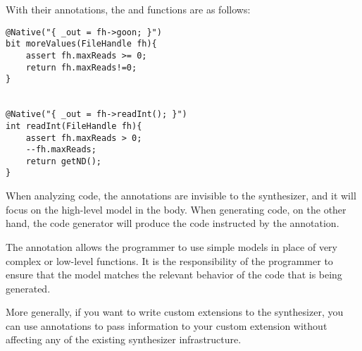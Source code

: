 \begin{Example}
With their annotations, the  and  functions are as follows:
\begin{lstlisting}
@Native("{ _out = fh->goon; }")
bit moreValues(FileHandle fh){
    assert fh.maxReads >= 0; 
    return fh.maxReads!=0;
}


@Native("{ _out = fh->readInt(); }")
int readInt(FileHandle fh){
    assert fh.maxReads > 0;
    --fh.maxReads; 
    return getND();
}
\end{lstlisting}

When analyzing code, the annotations are invisible to the synthesizer, and it will focus on the high-level model in the body. When generating code, on the other hand, the code generator will produce the code instructed by the  annotation.

\end{Example}

The  annotation allows the programmer to use simple models in place of very complex or low-level functions. It is the responsibility of the programmer to ensure that the model matches the relevant behavior of the code that is being generated. 

More generally, if you want to write custom extensions to the \Sk{} synthesizer, you can use annotations to pass information to your custom extension without affecting any of the existing synthesizer infrastructure. 

